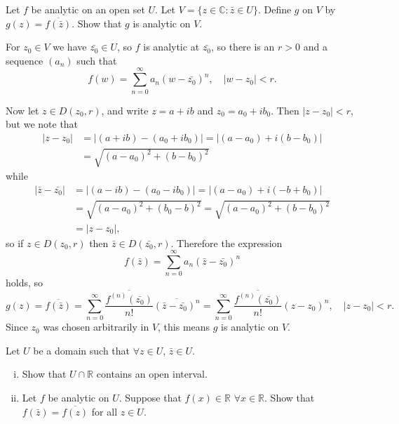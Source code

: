 \documentclass{article}
\newcounter{Problem}
\newenvironment{Problem}{\begin{Exercise}[name={Problem},
                                          counter={Problem}]}
                        {\end{Exercise}}
\begin{document}
\begin{Problem}
  Let $f$ be analytic on an open set $U$. Let
  $V = \{ z \in \mathbb{C} : \bar{z} \in U \}$. Define $g$ on $V$ by
  $g(z) = \overline{f(\bar{z})}$. Show that $g$ is analytic on $V$.
\end{Problem}

\begin{Answer}
For $z_0 \in V$ we have $\bar{z_0} \in U$, so
$f$ is analytic at $\bar{z_0}$, so there is an
$r > 0$ and a sequence $(a_n)$ such that
$$
  f(w)
= \sum_{n=0}^\infty a_n(w - \bar{z_0})^n, \quad
  |w - z_0| < r.
$$

Now let $z \in D(z_0, r)$, and write $z = a + ib$ and
$z_0 = a_0 + ib_0$. Then $|z - z_0| < r$, but we note that
\begin{align*}
  |z - z_0|
&= |(a + ib) - (a_0 + ib_0)|
 = |(a - a_0) + i(b - b_0)| \\
&= \sqrt{(a - a_0)^2 + (b - b_0)^2}
\end{align*}
while
\begin{align*}
  |\bar{z} - \bar{z_0}|
&= |(a - ib) - (a_0 - ib_0)|
 = |(a - a_0) + i(-b + b_0)| \\
&= \sqrt{(a - a_0)^2 + (b_0 - b)^2}
 = \sqrt{(a - a_0)^2 + (b - b_0)^2} \\
&= |z - z_0|,
\end{align*}
so if $z \in D(z_0, r)$ then $\bar{z} \in D(\bar{z_0}, r)$. Therefore
the expression
$$
f(\bar{z})
= \sum_{n=0}^\infty a_n (\bar{z} - \bar{z_0})^n
$$
holds, so
$$
  g(z)
= \overline{f(\bar{z})}
= \sum_{n=0}^\infty \frac{\overline{f^{(n)}(\bar{z_0})}}{n!}
                 \overline{(\bar{z} - \bar{z_0})^n}
= \sum_{n=0}^\infty \frac{\overline{f^{(n)}(\bar{z_0})}}{n!}
                 (z - z_0)^n, \quad
|z - z_0| < r.
$$
Since $z_0$ was chosen arbitrarily
in $V$, this means $g$ is analytic on $V$.
\end{Answer}

\begin{Problem}
  Let $U$ be a domain such that $\forall z \in U$, $\bar{z} \in U$.
  \begin{enumerate}[(i)]
    \item{
      Show that $U \cap \mathbb{R}$ contains an open interval.
    }
    \item{
      Let $f$ be analytic on $U$. Suppose that $f(x) \in \mathbb{R}$
      $\forall x \in \mathbb{R}$. Show that $f(\bar{z}) = \overline{f(z)}$
      for all $z \in U$.
    }
  \end{enumerate}
\end{Problem}
\end{document}
